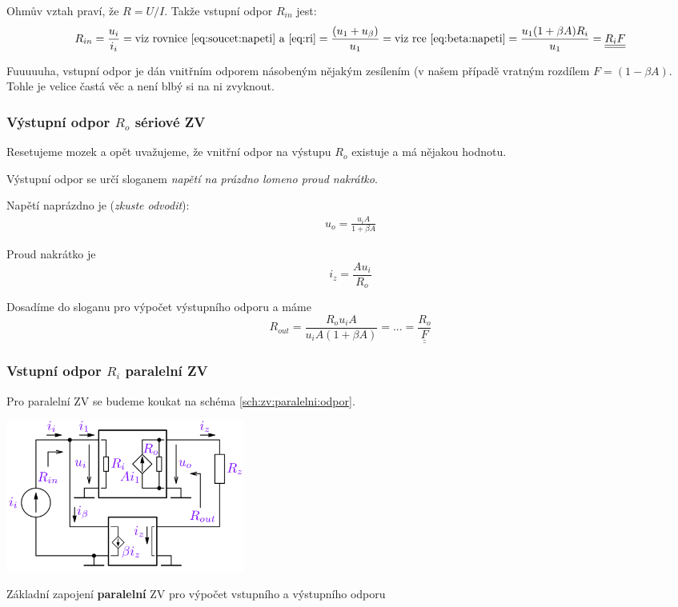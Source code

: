 \documentclass[a4paper,12pt]{article}   %
\begin{document}
Ohmův vztah praví, že $R=U/I$. Takže vstupní odpor $R_{in}$ jest:
\begin{equation}
    R_{in} = \frac{u_i}{i_i} = \text{viz rovnice \eqref{eq:soucet:napeti} a \eqref{eq:ri}} = \frac{(u_\text{1}+u_\beta)}{u_1} = \text{viz rce \eqref{eq:beta:napeti}} = \frac{u_\text{1}(1+\beta A)R_i}{u_\text{1}} = \underline{\underline{R_i F}}
\end{equation}

Fuuuuuha, vstupní odpor je dán vnitřním odporem násobeným nějakým zesílením (v našem případě vratným rozdílem $F=(1-\beta A)$. Tohle je velice častá věc a není blbý si na ni zvyknout.


\subsubsection{Výstupní odpor $R_o$ sériové ZV}

Resetujeme mozek a opět uvažujeme, že vnitřní odpor na výstupu $R_o$ existuje a má nějakou hodnotu.

Výstupní odpor se určí sloganem \textit{napětí na prázdno lomeno proud nakrátko}. 

Napětí naprázdno je (\textit{zkuste odvodit}):
\begin{align*}
    u_o = \frac{u_i A}{1+\beta A}
\end{align*}

Proud nakrátko je
\begin{equation*}
    i_z = \frac{A u_i}{R_o}
\end{equation*}

Dosadíme do sloganu pro výpočet výstupního odporu a máme
\begin{equation}
    R_{out} = \frac{R_o u_i A}{u_i A(1+\beta A)} =...= \underline{\underline{\frac{R_o}{F}}}
\end{equation}

\subsubsection{Vstupní odpor $R_i$ paralelní ZV}
Pro paralelní ZV se budeme koukat na schéma \ref{sch:zv:paralelni:odpor}.
\begin{schema}[h!]
    \centering
    \includegraphics[height=5cm]{ZV_paralelni-odpory.PNG}
    \caption{Základní zapojení \textbf{paralelní} ZV pro výpočet vstupního a výstupního odporu}
    \label{sch:zv:paralelni:odpor}
\end{schema}
\end{document}
